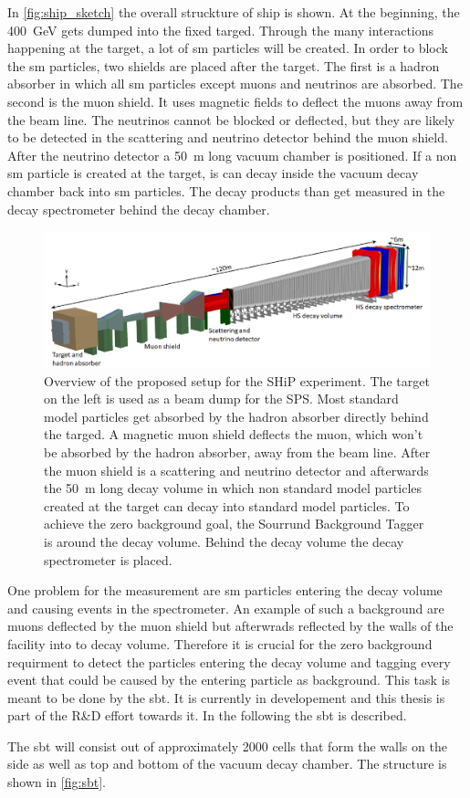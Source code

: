 In \autoref{fig:ship_sketch} the overall struckture of \ac{ship} is shown.
At the beginning, the \SI{400}{\giga\electronvolt} gets dumped into the fixed targed.
Through the many interactions happening at the target, a lot of \ac{sm} particles will be created.
In order to block the \ac{sm} particles, two shields are placed after the target.
The first is a hadron absorber in which all \ac{sm} particles except muons and neutrinos are absorbed.
The second is the muon shield. 
It uses magnetic fields to deflect the muons away from the beam line.
The neutrinos cannot be blocked or deflected, but they are likely to be detected in the scattering and neutrino detector behind the muon shield.
After the neutrino detector a \SI{50}{\meter} long vacuum chamber is positioned.
If a non \ac{sm} particle is created at the target, is can decay inside the vacuum decay chamber back into \ac{sm} particles.
The decay products than get measured in the decay spectrometer behind the decay chamber.
\begin{figure}
	\centering
	\includegraphics[width=1.\textwidth]{pictures/ship_sketch}
	\caption[Overview of the SHiP experiment.]{Overview of the proposed setup for the SHiP experiment. The target on the left is used as a beam dump for the SPS. Most standard model particles get absorbed by the hadron absorber directly behind the targed. A magnetic muon shield deflects the muon, which won't be absorbed by the hadron absorber, away from the beam line. After the muon shield is a scattering and neutrino detector and afterwards the \SI{50}{\meter} long decay volume in which non standard model particles created at the target can decay into standard model particles. To achieve the zero background goal, the Sourrund Background Tagger is around the decay volume. Behind the decay volume the decay spectrometer is placed. \cite{ship_coll}}
	\label{fig:ship_sketch}
\end{figure}

One problem for the measurement are \ac{sm} particles entering the decay volume and causing events in the spectrometer.
An example of such a background are muons deflected by the muon shield but afterwrads reflected by the walls of the facility into to decay volume.
Therefore it is crucial for the zero background requirment to detect the particles entering the decay volume and tagging every event that could be caused by the entering particle as background.
This task is meant to be done by the \ac{sbt}.
It is currently in developement and this thesis is part of the R\&D effort towards it.
In the following the \ac{sbt} is described.

The \ac{sbt} will consist out of approximately 2000 cells that form the walls on the side as well as top and bottom of the vacuum decay chamber.
The structure is shown in \autoref{fig:sbt}.

